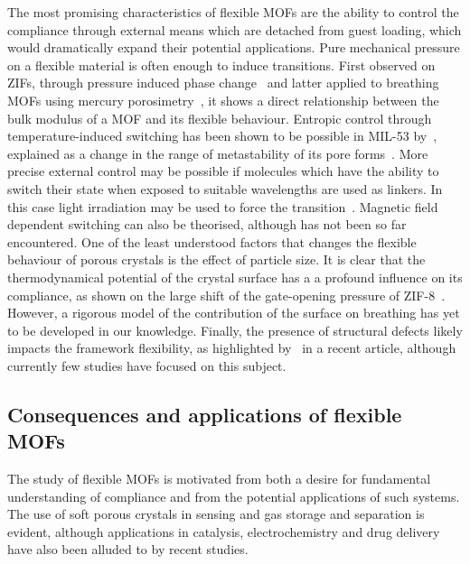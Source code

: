 The most promising characteristics of flexible MOFs are the ability
to control the compliance through external means which are 
detached from guest loading, which would dramatically expand
their potential applications. 
Pure mechanical pressure on a flexible material 
is often enough to induce transitions. First observed on 
ZIFs, through pressure induced phase 
change~\cite{chapmanTrappingGuestsNanoporous2011, %
tanMechanicalPropertiesHybrid2011} and 
latter applied to breathing MOFs using
mercury porosimetry~\cite{yotLargeBreathingMOF2012}, it 
shows a direct relationship between the bulk modulus of 
a MOF and its flexible behaviour.
Entropic control through temperature-induced switching has been
shown to be possible in MIL-53 
by~\citet{liuReversibleStructuralTransition2008}, explained 
as a change in the range of metastability of its 
pore forms~\cite{boutinBehaviorFlexibleMIL532010}. 
More precise external control may be possible if molecules which
have the ability to switch their state when exposed to suitable
wavelengths are used as linkers. In this case light irradiation 
may be used to force the 
transition~\cite{lyndonDynamicPhotoSwitchingMetalOrganic2013}.
Magnetic field dependent switching can also be theorised, although
has not been so far encountered.
One of the least understood factors that changes the flexible
behaviour of porous crystals is the effect of particle size.
It is clear that the thermodynamical potential of the crystal surface
has a a profound influence on its compliance, as shown on 
the large shift of the gate-opening pressure of 
ZIF-8~\cite{zhangCrystalSizeDependentStructuralTransitions2014}.
However, a rigorous model of the contribution of the surface 
on breathing has yet to be developed in our knowledge.
Finally, the presence of structural defects likely impacts 
the framework flexibility, as highlighted 
by~\citet{bennettInterplayDefectsDisorder2016} in a 
recent article, although currently few studies have focused
on this subject.

\subsection{Consequences and applications of flexible MOFs}

The study of flexible MOFs is motivated from both a desire 
for fundamental understanding of compliance and from the potential
applications of such systems. The use of soft porous crystals
in sensing and gas storage and separation is evident, although 
applications in catalysis, electrochemistry and drug delivery 
have also been alluded to by recent studies.

